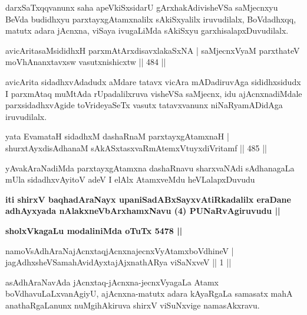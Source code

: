 \begin{artha}
darxSaTxqqvanunx saha apeVkiSxsidarU gArxhakAdivisheVSa saMjecnxyu BeVda budidhxyu parxtayxgAtamxnalilx sAkiSxyalilx iruvudilalx, BoVdadhxqq, matutx adara jAcnxna, viSaya ivugaLiMda sAkiSxyu garxhisalapxDuvudilalx.
\end{artha}


\begin{shl}
avicAritasaMsididhxH parxmAtArxdisavxlakaSxNA |
saMjecnxVyaM parxthateV moVhAnanxtavxsw vasutxnishicxtw \hfill  || 484 ||
\end{shl}

\begin{artha}
avicArita sidadhxvAdadudx aMdare tatavx vicAra mADadiruvAga sididhxsidudx I parxmAtaq muMtAda rUpadalilxruva visheVSa saMjecnx, idu ajAcnxnadiMdale parxsidadhxvAgide toVrideyaSeTx vasutx tatavxvanunx niNaRyamADidAga iruvudilalx.
\end{artha}

\begin{shl}
yata EvamataH sidadhxM dashaRnaM parxtayxgAtamxnaH |
shurxtAyxdisAdhanaM sAkASxtasxvaRmAtemxVtuyxdiVritamf \hfill  || 485 ||
\end{shl}

\begin{artha}
yAvakAraNadiMda parxtayxgAtamxna dashaRnavu sharxvaNAdi sAdhanagaLa mUla
sidadhxvAyitoV adeV I elAlx AtamxveMdu heVLalapxDuvudu 
\end{artha}

\begin{center}
\textbf{iti shirxV baqhadAraNayx upaniSadABxSayxvAtiRkadalilx eraDane
adhAyxyada nAlakxneVbArxhamxNavu (4) PUNaRvAgiruvudu ||}

\textbf{sholxVkagaLu modaliniMda oTuTx 5478 ||}
\end{center}

\centerline{}

\begin{shl}
namoV\s sAdhAraNajAcnxtaqjAcnxnajecnxVyAtamxboVdhineV |\\
jagAdhxsheVSamahAvidAyxtajAjxnathARya viSaNxveV \hfill || 1 ||
\end{shl}

\begin{artha}
asAdhAraNavAda jAcnxtaq-jAcnxna-jecnxVyagaLa Atamx boVdhavuLaLxvanAgiyU, ajAcnxna-matutx adara kAyaRgaLa samasatx mahA anathaRgaLanunx nuMgihAkiruva shirxV viSuNxvige namasAkxravu.
\end{artha}

